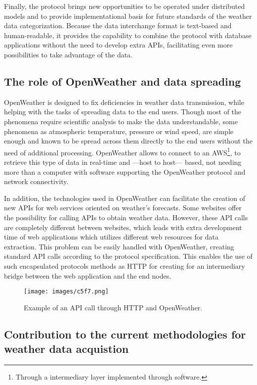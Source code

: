 Finally, the protocol brings new opportunities to be operated under distributed models and to provide implementational basis for future standards of the weather data categorization. Because the data interchange format is text-based and human-readable, it provides the capability to combine the protocol with database applications without the need to develop extra \gls{API}s, facilitating even more possibilities to take advantage of the data.

\subsection{The role of OpenWeather and data spreading}\label{5.1.2}

OpenWeather is designed to fix deficiencies in weather data transmission, while helping with the tasks of spreading data to the end users. Though most of the phenomena require scientific analysis to make the data understandable, some phenomena as atmospheric temperature, pressure or wind speed, are simple enough and known to be spread across them directly to the end users without the need of additional processing. OpenWeather allows to connect to an \gls{AWS}\footnote{Through a intermediary layer implemented through software.}, to retrieve this type of data in real-time and —host to host— based, not needing more than a computer with software supporting the OpenWeather protocol and network connectivity.

In addition, the technologies used in OpenWeather can facilitate the creation of new \gls{API}s for web services oriented on weather's forecasts. Some websites offer the possibility for calling \gls{API}s to obtain weather data. However, these \gls{API} calls are completely different between websites, which leads with extra development time of web applications which utilizes different web resources for data extraction. This problem can be easily handled with OpenWeather, creating standard \gls{API} calls according to the protocol specification. This enables the use of such encapsulated protocols methods as \gls{HTTP} for creating for an intermediary bridge between the web application and the end nodes.  

\begin{figure}[H]
\centerline{\texttt{[image: images/c5f7.png]}}
\caption{Example of an \protect \gls{API} call through \protect \gls{HTTP} and OpenWeather.}
\end{figure}

\subsection{Contribution to the current methodologies for weather data acquistion}

